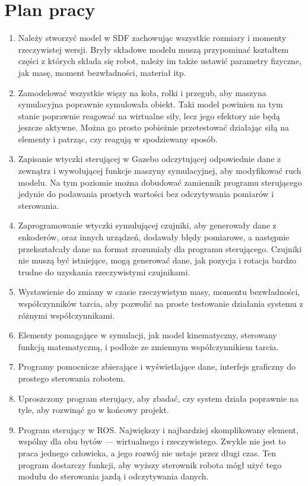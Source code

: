 \section{Plan pracy}
	\begin{enumerate}
	\item Należy stworzyć model w SDF zachowując wszystkie rozmiary i momenty rzeczywistej wersji.
	Bryły składowe modelu muszą przypominać kształtem części z których składa się robot, należy im także ustawić parametry fizyczne, jak masę, moment bezwładności, materiał itp.
	\item Zamodelować wszystkie więzy na koła, rolki i przegub, aby maszyna symulacyjna poprawnie symulowała obiekt.
	Taki model powinien na tym stanie poprawnie reagować na wirtualne siły, lecz jego efektory nie będą jeszcze aktywne.
	Można go prosto pobieżnie przetestować działając siłą na elementy i patrząc, czy reagują w spodziewany sposób.
	\item Zapisanie wtyczki sterującej w Gazebo odczytującej odpowiednie dane z zewnątrz i wywołującej funkcje maszyny symulacyjnej, aby modyfikować ruch modelu.
	Na tym poziomie można dobudować zamiennik programu sterującego jedynie do podawania prostych wartości bez odczytywania pomiarów i sterowania.
	\item Zaprogramowanie wtyczki symulującej czujniki, aby generowały dane z enkoderów, oraz innych urządzeń, dodawały błędy pomiarowe, a następnie przekształcały dane na format zrozumiały dla programu sterującego.
	Czujniki nie muszą być istniejące, mogą generować dane, jak pozycja i rotacja bardzo trudne do uzyskania rzeczywistymi czujnikami.
	\item Wystawienie do zmiany w czasie rzeczywistym masy, momentu bezwładności, współczynników tarcia, aby pozwolić na proste testowanie działania systemu z różnymi współczynnikami.
	\item Elementy pomagające w symulacji, jak model kinematyczny, sterowany funkcją matematyczną, i podłoże ze zmiennym współczynnikiem tarcia.
	\item Programy pomocnicze zbierające i wyświetlające dane, interfejs graficzny do prostego sterowania robotem.
	\item Uproszczony program sterujący, aby zbadać, czy system działa poprawnie na tyle, aby rozwinąć go w końcowy projekt.
	\item Program sterujący w ROS. Największy i najbardziej skomplikowany element, wspólny dla obu bytów --- wirtualnego i rzeczywistego.
	Zwykle nie jest to praca jednego człowieka, a jego rozwój nie ustaje przez długi czas.
	Ten program dostarczy funkcji, aby wyższy sterownik robota mógł użyć tego modułu do sterowania jazdą i odczytywania danych.
	\end{enumerate}

